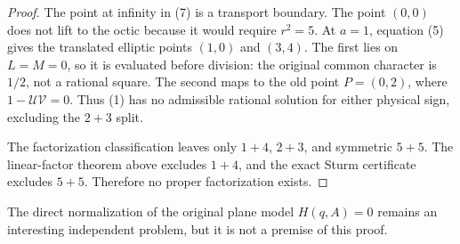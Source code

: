\documentclass[11pt]{article}
\begin{document}
\begin{proof}
The point at infinity in (7) is a transport boundary.  The point $(0,0)$
does not lift to the octic because it would require $r^2=5$.  At $a=1$,
equation (5) gives the translated elliptic points $(1,0)$ and $(3,4)$.  The
first lies on $L=M=0$, so it is evaluated before division: the original
common character is $1/2$, not a rational square.  The second maps to the old
point $P=(0,2)$, where $1-\mathcal U\mathcal V=0$.  Thus (1) has no
admissible rational solution for either physical sign, excluding the $2+3$
split.

The factorization classification leaves only $1+4$, $2+3$, and symmetric
$5+5$.  The linear-factor theorem above excludes $1+4$, and the exact Sturm
certificate excludes $5+5$.  Therefore no proper factorization exists.
\end{proof}

The direct normalization of the original plane model $H(q,A)=0$ remains an
interesting independent problem, but it is not a premise of this proof.
\end{document}
